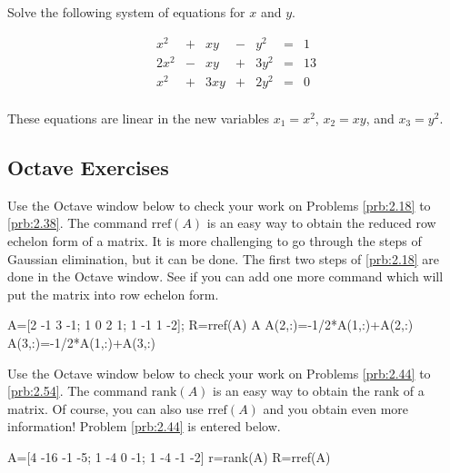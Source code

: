 \documentclass{ximera}
\begin{document}
\begin{problem}\label{prb:quadratic}
Solve the following system of equations for $x$ and $y$.

\begin{equation*}
\begin{array}{rlrlrcr}
	  x^2 & + &   xy & - &   y^2 & = &  1 \\
	 2x^2 & - &   xy & + &  3y^2 & = & 13 \\
	  x^2 & + &  3xy & + &  2y^2 & = &  0 \\
\end{array}
\end{equation*}

\begin{hint}
These equations are linear in the new variables $x_{1} = x^{2}$, $x_{2} = xy$, and $x_{3} = y^{2}$.
\end{hint}
\end{problem}


\subsection*{Octave Exercises}
\begin{problem}\label{oct:rref}
Use the Octave window below to check your work on Problems \ref{prb:2.18} to \ref{prb:2.38}.  The command $\mbox{rref}(A)$ is an easy way to obtain the reduced row echelon form of a matrix.  It is more challenging to go through the steps of Gaussian elimination, but it can be done.  The first two steps of \ref{prb:2.18} are done in the Octave window.  See if you can add one more command which will put the matrix into row echelon form.

A=[2 -1 3 -1; 1 0 2 1; 1 -1 1 -2];
R=rref(A)
A
A(2,:)=-1/2*A(1,:)+A(2,:)
A(3,:)=-1/2*A(1,:)+A(3,:)
\end{problem}

\begin{problem}\label{oct:rank}
Use the Octave window below to check your work on Problems \ref{prb:2.44} to \ref{prb:2.54}.  The command $\mbox{rank}(A)$ is an easy way to obtain the rank of a matrix.  Of course, you can also use $\mbox{rref}(A)$ and you obtain even more information!  Problem \ref{prb:2.44} is entered below.

A=[4 -16 -1 -5; 1 -4 0 -1; 1 -4 -1 -2]
r=rank(A)
R=rref(A)
\end{problem}
\end{document}
